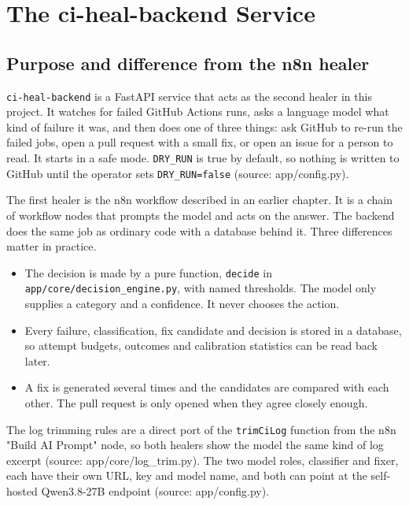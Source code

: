 
\chapter{The ci-heal-backend Service}

\section{Purpose and difference from the n8n healer}

\texttt{ci-\allowbreak{}heal-\allowbreak{}backend} is a FastAPI service that acts as the second healer in this project. It watches for failed GitHub Actions runs, asks a language model what kind of failure it was, and then does one of three things: ask GitHub to re-run the failed jobs, open a pull request with a small fix, or open an issue for a person to read. It starts in a safe mode. \texttt{DRY\_\allowbreak{}RUN} is true by default, so nothing is written to GitHub until the operator sets \texttt{DRY\_\allowbreak{}RUN=false} (source: app/\allowbreak{}config.py).

The first healer is the n8n workflow described in an earlier chapter. It is a chain of workflow nodes that prompts the model and acts on the answer. The backend does the same job as ordinary code with a database behind it. Three differences matter in practice.

\begin{itemize}[leftmargin=*, itemsep=2pt]
\item The decision is made by a pure function, \texttt{decide} in \texttt{app/\allowbreak{}core/\allowbreak{}decision\_\allowbreak{}engine.\allowbreak{}py}, with named thresholds. The model only supplies a category and a confidence. It never chooses the action.
\item Every failure, classification, fix candidate and decision is stored in a database, so attempt budgets, outcomes and calibration statistics can be read back later.
\item A fix is generated several times and the candidates are compared with each other. The pull request is only opened when they agree closely enough.
\end{itemize}

The log trimming rules are a direct port of the \texttt{trimCiLog} function from the n8n "Build AI Prompt" node, so both healers show the model the same kind of log excerpt (source: app/\allowbreak{}core/\allowbreak{}log\_\allowbreak{}trim.py). The two model roles, classifier and fixer, each have their own URL, key and model name, and both can point at the self-hosted Qwen3.8-27B endpoint (source: app/\allowbreak{}config.py).


